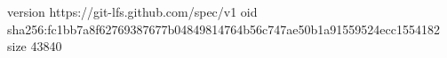 version https://git-lfs.github.com/spec/v1
oid sha256:fc1bb7a8f62769387677b04849814764b56c747ae50b1a91559524ecc1554182
size 43840
